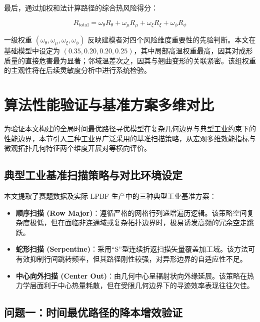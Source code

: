 \documentclass[a4paper, 12pt]{ctexart}
\begin{document}
最后，通过加权和法计算路径的综合热风险得分：

\begin{equation}
    R_{\text{total}} = \omega_{\theta} R_{\theta} + \omega_{\mu} R_{\mu} + \omega_{\xi} R_{\xi} + \omega_{\phi} R_{\phi}
\end{equation}

一级权重 $(\omega_{\theta}, \omega_{\mu}, \omega_{\xi}, \omega_{\phi})$ 反映建模者对四个风险维度重要性的先验判断。本文在基础模型中设定为 $(0.35, 0.20, 0.20, 0.25)$，其中局部高温权重最高，因其对成形质量的直接危害最为显著；邻域温差次之，因其与翘曲变形的关联紧密。该组权重的主观性将在后续灵敏度分析中进行系统检验。



\vspace{1em}
\section{算法性能验证与基准方案多维对比}
\vspace{0.5em}

为验证本文构建的全局时间最优路径寻优模型在复杂几何边界与典型工业约束下的性能边界，本节引入三种工业界广泛采用的基准扫描策略，从宏观多维效能指标与微观拓扑几何特征两个维度开展对等横向评价。

\subsection{典型工业基准扫描策略与对比环境设定}

本文提取了赛题数据及实际 LPBF 生产中的三种典型工业基准方案：
\begin{itemize}
    \item \textbf{顺序扫描 (Row Major)}：遵循严格的网格行列递增遍历逻辑。该策略空间复杂度极低，但在面临非连通域或复杂拓扑边界时，极易诱发高频的冗余空走跳跃。
    \item \textbf{蛇形扫描 (Serpentine)}：采用“S”型连续折返扫描矢量覆盖加工域。该方法可有效抑制行间跳转频率，但其路径刚性较强，对异形边界的自适应性不足。
    \item \textbf{中心向外扫描 (Center Out)}：由几何中心呈辐射状向外缘延展。该策略在热力学层面利于中心热量耗散，但在受限几何边界下的寻迹效率表现往往欠佳。
\end{itemize}

\subsection{问题一：时间最优路径的降本增效验证}
\end{document}
